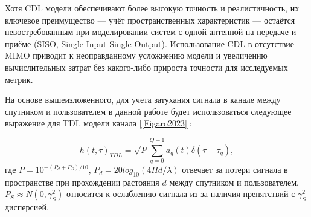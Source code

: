 Хотя CDL модели обеспечивают более высокую точность и реалистичность,
их ключевое преимущество — учёт пространственных характеристик — 
остаётся невостребованным при моделировании систем с одной антенной на передаче и приёме (SISO, Single Input Single Output).
Использование CDL в отсутствие MIMO приводит к неоправданному усложнению модели и увеличению
вычислительных затрат без какого-либо прироста точности для исследуемых метрик.


На основе вышеизложенного, для учета затухания сигнала в канале между спутником и пользователем в данной работе
будет использоваться следующее выражение для TDL модели канала [\ref{Figaro2023}]:

\begin{equation}
    h(t, \tau)_{TDL} = \sqrt{P} \sum_{q = 0}^{Q - 1} a_q(t) \delta (\tau - \tau_q),
    \label{eq:tdl_channel}
\end{equation}
\noindent где $P = 10^{-(P_d + P_S)/10}$, $P_d = 20log_{10} (4 \Pi d / \lambda)$ отвечает за 
потери сигнала в пространстве при прохождении растояния $d$ между спутником и пользователем,
$P_S \approx N(0, \gamma^2_S)$ относится к ослаблению сигнала из-за наличия препятствий с $\gamma^2_S$ дисперсией.

